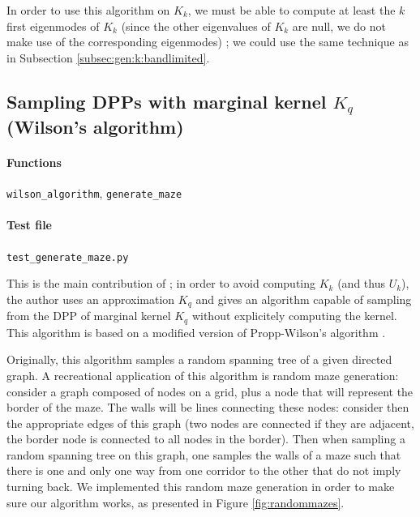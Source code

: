 \documentclass{article}
\begin{document}
In order to use this algorithm on $K_k$, we must be able to compute at least the $k$ first eigenmodes of $K_k$ (since the other eigenvalues of $K_k$ are null, we do not make use of the corresponding eigenmodes) ; we could use the same technique as in Subsection \ref{subsec:gen:k:bandlimited}.%


\subsection[Sampling DPPs with marginal kernel Kq (Wilson's algorithm)]{Sampling DPPs with marginal kernel $K_q$ (Wilson's algorithm)}


\paragraph{Functions} \verb#wilson_algorithm#, \verb#generate_maze#
\paragraph{Test file} \verb#test_generate_maze.py#


This is the main contribution of \cite{tremblay2017} ; in order to avoid computing $K_k$ (and thus $U_k$), the author uses an approximation $K_q$ and gives an algorithm capable of sampling from the DPP of marginal kernel $K_q$ without explicitely computing the kernel. This algorithm is based on a modified version of Propp-Wilson's algorithm \cite{propp1998}. 


Originally, this algorithm samples a random spanning tree of a given directed graph. A recreational application of this algorithm is random maze generation: consider a graph composed of nodes on a grid, plus a node that will represent the border of the maze. The walls will be lines connecting these nodes: consider then the appropriate edges of this graph (two nodes are connected if they are adjacent, the border node is connected to all nodes in the border). Then when sampling a random spanning tree on this graph, one samples the walls of a maze such that there is one and only one way from one corridor to the other that do not imply turning back. We implemented this random maze generation in order to make sure our algorithm works, as presented in Figure \ref{fig:randommazes}.
\end{document}
